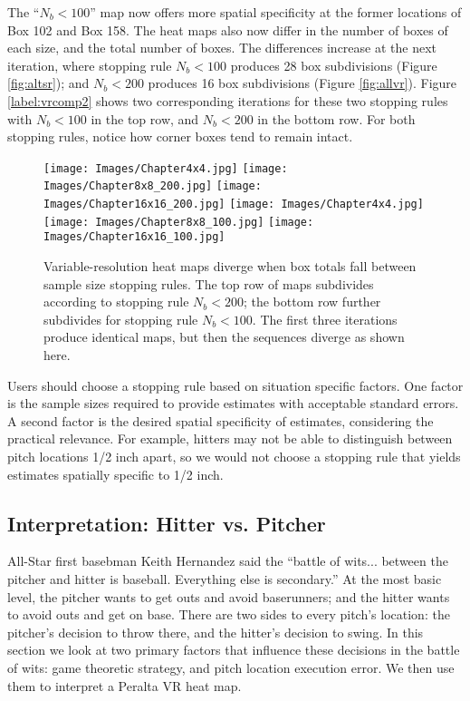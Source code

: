 The ``$N_{b} < 100$'' map now offers more spatial specificity at the former locations of Box 102 and Box 158. The heat maps also now differ in the number of boxes of each size, and the total number of boxes.  The differences increase at the next iteration, where stopping rule $N_{b} < 100$ produces 28 box subdivisions (Figure \ref{fig:altsr}); and $N_{b} < 200$ produces 16 box subdivisions (Figure \ref{fig:allvr}). Figure \ref{label:vrcomp2} shows two corresponding iterations for these two stopping rules with $N_{b} < 100$ in the top row, and $N_{b} < 200$ in the bottom row. For both stopping rules, notice how corner boxes tend to remain intact.
        \begin{figure}[H]
      	\centering      
      	\texttt{[image: Images/Chapter4x4.jpg]}
      	\texttt{[image: Images/Chapter8x8\_200.jpg]}
      	\texttt{[image: Images/Chapter16x16\_200.jpg]}
      	\texttt{[image: Images/Chapter4x4.jpg]}
      	\texttt{[image: Images/Chapter8x8\_100.jpg]}
      	\texttt{[image: Images/Chapter16x16\_100.jpg]}
      	\caption{Variable-resolution heat maps diverge when box totals fall between sample size stopping rules. The top row of maps subdivides according to stopping rule $N_{b} < 200$; the bottom row further subdivides for stopping rule $N_{b} < 100$. The first three iterations produce identical maps, but then the sequences diverge as shown here.}
      	\label{fig:vrcomp2}
\end{figure}
Users should choose a stopping rule based on situation specific factors. One factor is the sample sizes required to provide estimates with acceptable standard errors. A second factor is the desired spatial specificity of estimates, considering the practical relevance. For example, hitters may not be able to distinguish between pitch locations 1/2 inch apart, so we would not choose a stopping rule that yields estimates spatially specific to 1/2 inch.

\subsection{Interpretation: Hitter vs. Pitcher} %

All-Star first basebman Keith Hernandez said the ``battle of wits... between the pitcher and hitter is baseball. Everything else is secondary.'' At the most basic level, the pitcher wants to get outs and avoid baserunners; and the hitter wants to avoid outs and get on base. There are two sides to every pitch's location: the pitcher's decision to throw there, and the hitter's decision to swing. In this section we look at two primary factors that influence these decisions in the battle of wits: game theoretic strategy, and pitch location execution error. We then use them to interpret a Peralta VR heat map.

